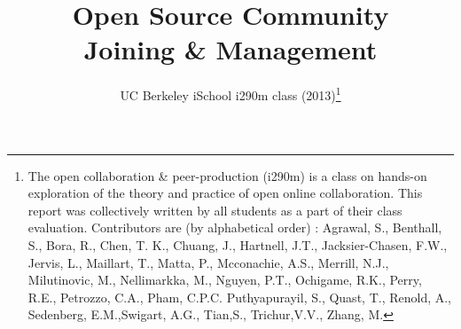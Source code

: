 \documentclass[runningheads,a4paper]{llncs}
\begin{document}
\mainmatter  %

\title{Open Source Community \\ Joining \& Management\\}


%
%
\author{UC Berkeley iSchool i290m class (2013)\footnote{The open collaboration \& peer-production (i290m) is a class on hands-on exploration of the theory and practice of open online collaboration. This report was collectively written by all students as a part of their class evaluation. Contributors are (by alphabetical order) : Agrawal, S., Benthall, S., Bora, R., Chen, T. K., Chuang, J., Hartnell, J.T., Jacksier-Chasen, F.W., Jervis, L., Maillart, T., Matta, P.,  Mcconachie, A.S., Merrill, N.J., Milutinovic, M., Nellimarkka, M., 
Nguyen, P.T., Ochigame, R.K., Perry, R.E., Petrozzo, C.A., Pham, C.P.C.
Puthyapurayil, S., Quast, T., Renold, A.,  Sedenberg, E.M.,Swigart, A.G., Tian,S., Trichur,V.V., Zhang, M.}}


%
%
%
\end{document}
